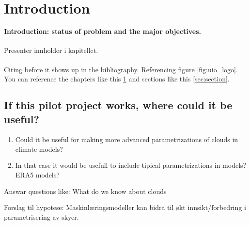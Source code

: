 \chapter{Introduction} \label{ch:introduction}
\textbf{Introduction: status of problem and the major objectives.}
\\ \\ 
Presenter innholder i kapitellet. 
\\ \\
Citing \cite{einstein} before it shows up in the bibliography. Referencing figure \ref{fig:uio_logo}. You can reference the chapters like this \ref{ch:introduction} and sections like this \ref{sec:section}.

\section{If this pilot project works, where could it be useful?}
\begin{enumerate}
    \item Could it be useful for making more advanced parametrizations of clouds in climate models?
    \item In that case it would be usefull to include tipical parametrizations in models? ERA5 models?
\end{enumerate}

Answar questions like: What do we know about clouds 

Forslag til hypotese: Maskinlæringsmodeller kan bidra til økt innsikt/forbedring i parametrisering av skyer. 